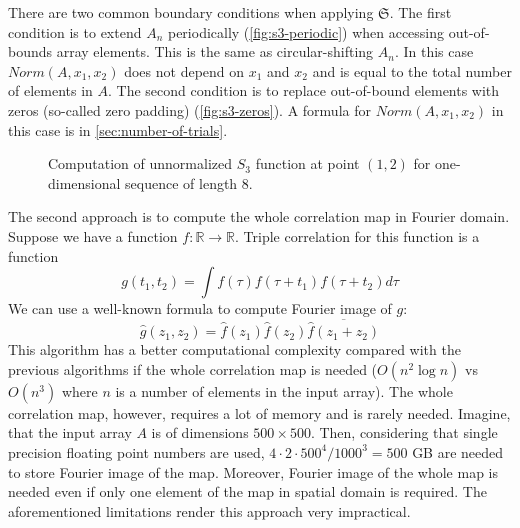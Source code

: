 \documentclass[1p]{elsarticle}
\begin{document}
There are two common boundary conditions when applying $\mathfrak{S}$. The first
condition is to extend $A_n$ periodically (\cref{fig:s3-periodic}) when
accessing out-of-bounds array elements. This is the same as circular-shifting
$A_n$. In this case $Norm(A, x_1, x_2)$ does not depend on $x_1$ and $x_2$ and
is equal to the total number of elements in $A$. The second condition is to
replace out-of-bound elements with zeros (so-called zero padding)
(\cref{fig:s3-zeros}). A formula for $Norm(A, x_1, x_2)$ in this case is in
\ref{sec:number-of-trials}.
\begin{figure}[tp]
  \centering
  \hfill
  \caption[]{Computation of unnormalized $S_3$ function at point $(1, 2)$ for
    one-dimensional sequence of length 8.}
  \label{fig:s3-computation}
\end{figure}

The second approach is to compute the whole correlation map in Fourier
domain. Suppose we have a function
$f: \mathbb{R} \rightarrow \mathbb{R}$. Triple correlation for this function is
a function
\begin{equation}
  g(t_1, t_2) = \int f(\tau) f(\tau + t_1) f(\tau + t_2) d \tau
\end{equation}
We can use a well-known formula to compute Fourier image of $g$:
\begin{equation}
  \hat{g}(z_1, z_2) = \hat{f}(z_1) \hat{f}(z_2) \overline{\hat{f}(z_1 + z_2)}
\end{equation}
This algorithm has a better computational complexity compared with the previous
algorithms if the whole correlation map is needed ($O(n^2 \log n)$ vs
$O(n^3)$ where $n$ is a number of elements in the input array). The whole
correlation map, however, requires a lot of memory and is rarely
needed. Imagine, that the input array $A$ is of dimensions $500 \times 500$.
Then, considering that single precision floating point numbers are used,
$4 \cdot 2 \cdot 500^4 / 1000^3 = 500$ GB are needed to store Fourier image of
the map. Moreover, Fourier image of the whole map is needed even if only one
element of the map in spatial domain is required. The aforementioned limitations
render this approach very impractical.
\end{document}
